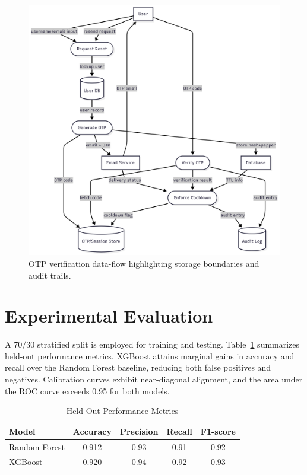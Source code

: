 \documentclass[conference]{IEEEtran}
\begin{document}
\begin{figure}[t]
  \centering
  \includegraphics[width=0.9\linewidth]{detailed_data_flow.png}
  \caption{OTP verification data-flow highlighting storage boundaries and audit trails.}
  \label{fig:dfd}
\end{figure}

\section{Experimental Evaluation}
A 70/30 stratified split is employed for training and testing. Table~\ref{tab:metrics} summarizes held-out performance metrics. XGBoost attains marginal gains in accuracy and recall over the Random Forest baseline, reducing both false positives and negatives. Calibration curves exhibit near-diagonal alignment, and the area under the ROC curve exceeds 0.95 for both models.

\begin{table}[t]
  \caption{Held-Out Performance Metrics}
  \label{tab:metrics}
  \centering
  \begin{tabular}{lcccc}
    \toprule
    Model & Accuracy & Precision & Recall & F1-score \\
    \midrule
    Random Forest & 0.912 & 0.93 & 0.91 & 0.92 \\
    XGBoost & 0.920 & 0.94 & 0.92 & 0.93 \\
    \bottomrule
  \end{tabular}
\end{table}
\end{document}
